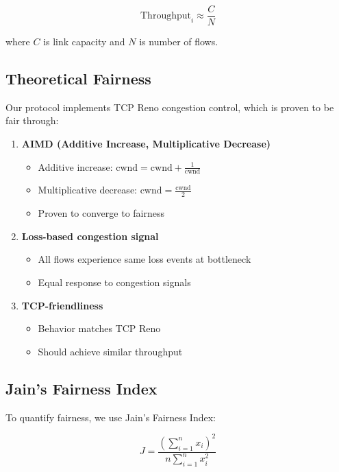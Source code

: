 \documentclass[11pt,a4paper]{article}
\begin{document}
\begin{equation}
\text{Throughput}_i \approx \frac{C}{N}
\end{equation}

where $C$ is link capacity and $N$ is number of flows.

\subsection{Theoretical Fairness}

Our protocol implements TCP Reno congestion control, which is proven to be fair through:

\begin{enumerate}
    \item \textbf{AIMD (Additive Increase, Multiplicative Decrease)}
    \begin{itemize}
        \item Additive increase: $\text{cwnd} = \text{cwnd} + \frac{1}{\text{cwnd}}$
        \item Multiplicative decrease: $\text{cwnd} = \frac{\text{cwnd}}{2}$
        \item Proven to converge to fairness
    \end{itemize}
    
    \item \textbf{Loss-based congestion signal}
    \begin{itemize}
        \item All flows experience same loss events at bottleneck
        \item Equal response to congestion signals
    \end{itemize}
    
    \item \textbf{TCP-friendliness}
    \begin{itemize}
        \item Behavior matches TCP Reno
        \item Should achieve similar throughput
    \end{itemize}
\end{enumerate}

\subsection{Jain's Fairness Index}

To quantify fairness, we use Jain's Fairness Index:

\begin{equation}
J = \frac{\left(\sum_{i=1}^{n} x_i\right)^2}{n \sum_{i=1}^{n} x_i^2}
\end{equation}
\end{document}
